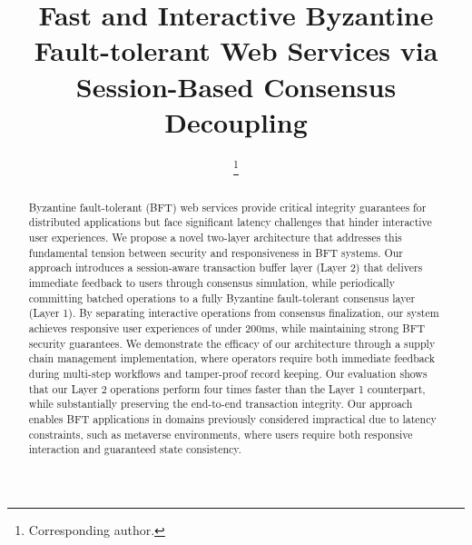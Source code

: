 \documentclass[conference]{IEEEtran}
\begin{document}
\title{Fast and Interactive Byzantine Fault-tolerant Web Services via Session-Based Consensus Decoupling}


\author{
\thanks{Corresponding author.}
}

\maketitle

\begin{abstract}
Byzantine fault-tolerant (BFT) web services provide critical integrity guarantees for distributed applications but face significant latency challenges that hinder interactive user experiences. We propose a novel two-layer architecture that addresses this fundamental tension between security and responsiveness in BFT systems. Our approach introduces a session-aware transaction buffer layer (Layer 2) that delivers immediate feedback to users through consensus simulation, while periodically committing batched operations to a fully Byzantine fault-tolerant consensus layer (Layer 1). By separating interactive operations from consensus finalization, our system achieves responsive user experiences of under 200ms, while maintaining strong BFT security guarantees. We demonstrate the efficacy of our architecture through a supply chain management implementation, where operators require both immediate feedback during multi-step workflows and tamper-proof record keeping. Our evaluation shows that our Layer 2 operations perform four times faster than the Layer 1 counterpart, while substantially preserving the end-to-end transaction integrity. Our approach enables BFT applications in domains previously considered impractical due to latency constraints, such as metaverse environments, where users require both responsive interaction and guaranteed state consistency.
\end{abstract}
\end{document}
